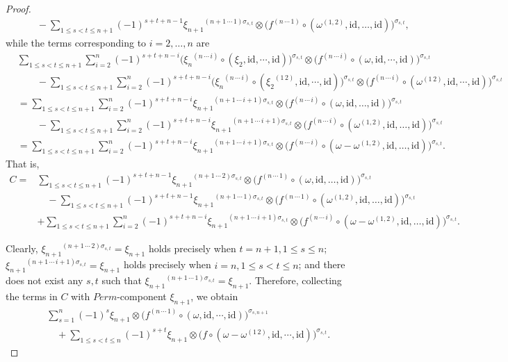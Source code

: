 \documentclass[12pt]{amsart}
\theoremstyle{definition}
\newcommand{\id}{\mathrm{id}}
\newcommand{\ot}{\otimes}
\begin{document}
\begin{proof}
\begin{align*}
	&\quad\quad-
	\sum_{1\leq s<t\leq n+1}
	(-1)^{s+t+n-1}
	{\xi_{n+1}}^{(n+1\,\cdots\,1)\sigma_{s,t}}
	\otimes
	\bigl(f^{(n\,\cdots\,1)}
	\circ(\omega^{(1,2)},\id,\dots,\id)\bigr)^{\sigma_{s,t}},
\end{align*}
while the terms corresponding to $i=2,\ldots,n$ are
\begin{align*}
&\sum\limits_{1\leq s<t\leq n+1}\sum\limits_{i=2}^n(-1)^{s+t+n-i}\bigl( {\xi_n}^{(n\,\cdots\,i)}\circ(\xi_2,\id,\cdots,\id)\bigr)^{\sigma_{s,t}}\ot \bigl(f^{(n\,\cdots\,i)}\circ(\omega,\id,\cdots,\id)\bigr)^{\sigma_{s,t}}\\
&\quad\quad-\sum\limits_{1\leq s<t\leq n+1}\sum\limits_{i=2}^n(-1)^{s+t+n-i}\bigl( {\xi_n}^{(n\,\cdots\,i)}\circ({\xi_2}^{(1\,2)},\id,\cdots,\id)\bigr)^{\sigma_{s,t}}\ot \bigl(f^{(n\,\cdots\,i)}\circ(\omega^{(1\,2)},\id,\cdots,\id)\bigr)^{\sigma_{s,t}}\\
&=\sum_{1\leq s<t\leq n+1}\sum_{i=2}^n(-1)^{s+t+n-i}{\xi_{n+1}}^{(n+1\,\cdots\,i+1)\sigma_{s,t}}
\otimes\bigl(f^{(n\,\cdots\,i)}\circ(\omega,\id,\dots,\id)\bigr)^{\sigma_{s,t}}\\
&\quad\quad-\sum_{1\leq s<t\leq n+1}\sum_{i=2}^n(-1)^{s+t+n-i}{\xi_{n+1}}^{(n+1\,\cdots\,i+1)\sigma_{s,t}}\otimes
	\bigl(f^{(n\,\cdots\,i)}
	\circ(\omega^{(1,2)},\id,\dots,\id)\bigr)^{\sigma_{s,t}}\\
&=\sum_{1\leq s<t\leq n+1}\sum_{i=2}^n
	(-1)^{s+t+n-i}
	{\xi_{n+1}}^{(n+1\,\cdots\,i+1)\sigma_{s,t}}
	\otimes
	\bigl(f^{(n\,\cdots\,i)}
	\circ(\omega-\omega^{(1,2)},\id,\dots,\id)\bigr)^{\sigma_{s,t}}.
\end{align*}
That is,
\begin{align*}
C= 	&\sum_{1\leq s<t\leq n+1}
(-1)^{s+t+n-1}
{\xi_{n+1}}^{(n+1\,\cdots\,2)\sigma_{s,t}}
\otimes
\bigl(f^{(n\,\cdots\,1)}
\circ(\omega,\id,\dots,\id)\bigr)^{\sigma_{s,t}}\\
&\quad-
\sum_{1\leq s<t\leq n+1}
(-1)^{s+t+n-1}
{\xi_{n+1}}^{(n+1\,\cdots\,1)\sigma_{s,t}}
\otimes
\bigl(f^{(n\,\cdots\,1)}
\circ(\omega^{(1,2)},\id,\dots,\id)\bigr)^{\sigma_{s,t}}\\
&+\sum_{1\leq s<t\leq n+1}\sum_{i=2}^n
(-1)^{s+t+n-i}
{\xi_{n+1}}^{(n+1\,\cdots\,i+1)\sigma_{s,t}}
\otimes
\bigl(f^{(n\,\cdots\,i)}
\circ(\omega-\omega^{(1,2)},\id,\dots,\id)\bigr)^{\sigma_{s,t}}.
\end{align*}

  	Clearly, ${\xi_{n+1}}^{(n+1\,\cdots\,2)\sigma_{s,t}}=\xi_{n+1}$ holds precisely when  $t=n+1,1\leqslant s\leqslant n$; ${\xi_{n+1}}^{(n+1\,\cdots\,i+1)\sigma_{s,t}}=\xi_{n+1}$ holds precisely when $i=n,1\leqslant s<t\leqslant n$; and there does not exist any $s,t$ such that ${\xi_{n+1}}^{(n+1\,\cdots\,1)\sigma_{s,t}}=\xi_{n+1}$. Therefore, collecting the terms in $C$ with $Perm$-component $\xi_{n+1}$, we obtain
	\begin{eqnarray}\label{eq-preL-cochain-3}
		&&\sum\limits_{s=1}^n (-1)^{s} \xi_{n+1}\ot \bigl(f^{(n\,\cdots\,1)}\circ(\omega,\id,\cdots,\id)\bigr)^{\sigma_{s,n+1}}\\
		&&\quad+\sum\limits_{1\leqslant s<t\leqslant n}(-1)^{s+t} \xi_{n+1}\ot \bigl(f\circ(\omega-\omega^{(1\,2)},\id,\cdots,\id)\bigr)^{\sigma_{s,t}}.\nonumber
	\end{eqnarray}
	

\end{proof}
\end{document}
